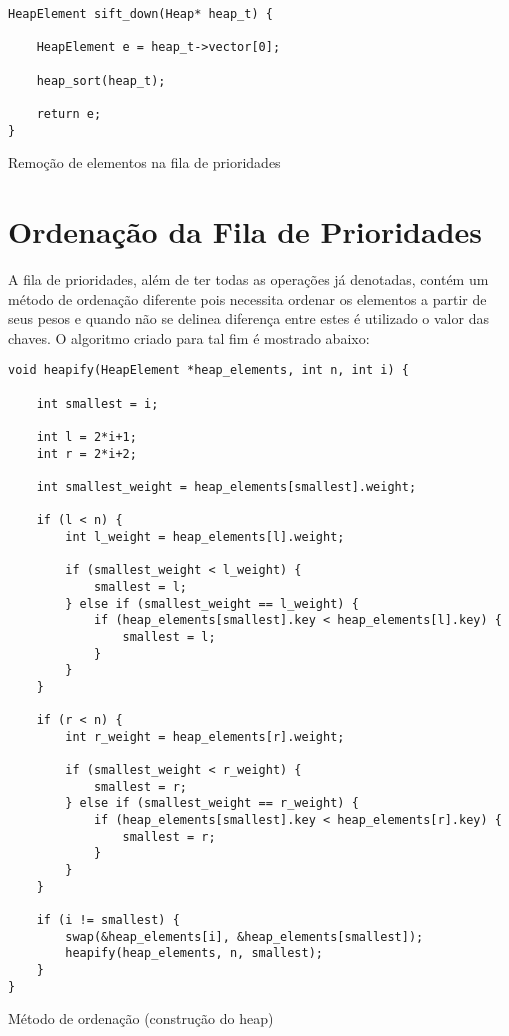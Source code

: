 \documentclass[a4paper, 12pt]{report}
\begin{document}
\begin{listing}[H]
\begin{verbatim}
HeapElement sift_down(Heap* heap_t) {

    HeapElement e = heap_t->vector[0];

    heap_sort(heap_t);

    return e;
}
\end{verbatim}
\caption{Remoção de elementos na fila de prioridades}
\end{listing}

\chapter{Ordenação da Fila de Prioridades}
\label{sec-3-2}

A fila de prioridades, além de ter todas as operações já denotadas, contém
um método de ordenação diferente pois necessita ordenar os elementos a partir
de seus pesos e quando não se delinea diferença entre estes é utilizado o
valor das chaves. O algoritmo criado para tal fim é mostrado abaixo:

\begin{listing}[H]
\begin{verbatim}
void heapify(HeapElement *heap_elements, int n, int i) {

    int smallest = i;

    int l = 2*i+1;
    int r = 2*i+2;

    int smallest_weight = heap_elements[smallest].weight;

    if (l < n) {
        int l_weight = heap_elements[l].weight;

        if (smallest_weight < l_weight) {
            smallest = l;
        } else if (smallest_weight == l_weight) {
            if (heap_elements[smallest].key < heap_elements[l].key) {
                smallest = l;
            }
        }
    }

    if (r < n) {
        int r_weight = heap_elements[r].weight;

        if (smallest_weight < r_weight) {
            smallest = r;
        } else if (smallest_weight == r_weight) {
            if (heap_elements[smallest].key < heap_elements[r].key) {
                smallest = r;
            }
        }
    }

    if (i != smallest) {
        swap(&heap_elements[i], &heap_elements[smallest]);
        heapify(heap_elements, n, smallest);
    }
}
\end{verbatim}
\caption{Método de ordenação (construção do heap)}
\end{listing}
\end{document}

